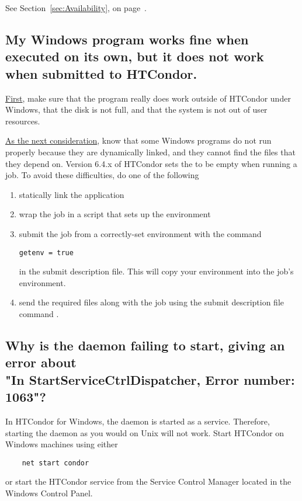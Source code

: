 See Section~\ref{sec:Availability}, on
page~\pageref{sec:Availability}.


\subsection*{My Windows program works fine when executed on its own, but it
does not work when submitted to HTCondor.}

\underline{First}, make sure that the program really does work
outside of HTCondor under Windows,
that the disk is not full,
and that the system is not out of user resources.

\underline{As the next consideration},
know that 
some Windows programs do not run properly because they are dynamically linked,
and they cannot find the  files that they depend on.
Version 6.4.x of HTCondor sets the  to be empty when
running a job.
To avoid these difficulties, do one of the following
\begin{enumerate}
\item statically link the application
\item wrap the job in a script that sets up the environment
\item submit the job from a correctly-set environment with the command
\begin{verbatim}
getenv = true
\end{verbatim}
in the submit description file.
This will copy your environment into the job's environment.
\item send the required  files along with the job
using the submit description file command .
\end{enumerate}


\subsection*{Why is the  daemon failing to start, giving an error about\\
   	"In StartServiceCtrlDispatcher, Error number: 1063"?}
In HTCondor for Windows, the  daemon is started as a service.
Therefore,
starting the  daemon as you would on Unix will not work.
Start HTCondor on Windows machines using either
\begin{verbatim}
	net start condor
\end{verbatim}
or start the HTCondor service from the Service Control Manager located in
the Windows Control Panel.

